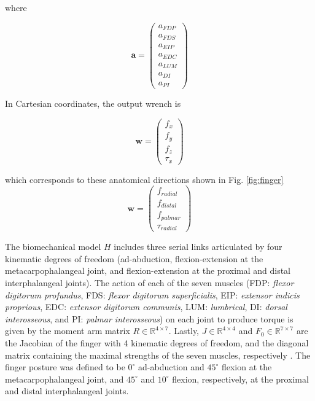 \documentclass[10pt,letterpaper]{article}
\begin{document}
where 

\begin{equation}
\label{eq:a}
\textbf{a}= 
\begin{pmatrix}
a_{FDP}\\
a_{FDS}\\
a_{EIP}\\
a_{EDC}\\
a_{LUM}\\
a_{DI}\\
a_{PI}
\end{pmatrix}
\end{equation}

In Cartesian coordinates, the output wrench is

\begin{equation}
\label{eq:wc}
\textbf{w}= 
\begin{pmatrix}
f_{x}\\
f_{y}\\
f_{z}\\
\tau_{x}
\end{pmatrix}
\end{equation}

which corresponds to these anatomical directions shown in Fig. \ref{fig:finger}
\begin{equation}
\label{eq:wa}
\textbf{w}= 
\begin{pmatrix}
f_{radial}\\
f_{distal}\\
f_{palmar}\\
\tau_{radial}
\end{pmatrix}
\end{equation}

The biomechanical model $H$ includes three serial links articulated by four kinematic degrees of freedom (ad-abduction, flexion-extension at the metacarpophalangeal joint, and flexion-extension at the proximal and distal interphalangeal joints). The action of each of the seven muscles (FDP: \emph{flexor digitorum profundus}, FDS: \emph{flexor digitorum superficialis}, EIP: \emph{extensor indicis proprious}, EDC: \emph{extensor digitorum communis}, LUM: \emph{lumbrical}, DI: \emph{dorsal interosseous}, and PI: \emph{palmar interosseous}) on each joint to produce torque is given by the moment arm matrix $R \in \mathbb{R}^{4 \times 7}$. Lastly, $J \in \mathbb{R}^{4 \times 4}$ and $F_0 \in \mathbb{R}^{7 \times 7}$ are the Jacobian of the finger with 4 kinematic degrees of freedom, and the diagonal  matrix containing the maximal strengths of the seven muscles, respectively \cite{Valero-Cuevas1998Large,valero-cuevas2015fundamentals,Valero-Cuevas2000Scaling}. The finger posture was defined to be $0^\circ$  ad-abduction and $45^\circ$ flexion at the metacarpophalangeal joint, and $45^\circ$ and $10^\circ$ flexion, respectively, at the proximal and distal interphalangeal joints.
\end{document}
